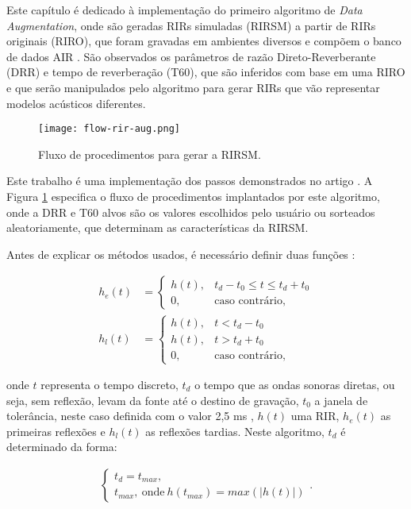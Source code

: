 Este capítulo é dedicado à implementação do primeiro algoritmo de \textit{Data Augmentation}, onde são geradas RIRs simuladas (RIRSM)
a partir de RIRs originais (RIRO), que foram gravadas em ambientes diversos e compõem o banco de dados AIR \cite{AIR_Database}. 
São observados os parâmetros de razão Direto-Reverberante (DRR) e tempo de reverberação (T60), que são
inferidos com base em uma RIRO e que serão manipulados pelo algoritmo para gerar RIRs que vão representar modelos acústicos diferentes.

\begin{figure} [H]
    \centering
    \texttt{[image: flow-rir-aug.png]}
    \caption{Fluxo de procedimentos para gerar a RIRSM.}
    \label{fig:flow-rir-aug}
\end{figure}

Este trabalho é uma implementação dos passos demonstrados no artigo \cite{RIR_Data_Aug}. A Figura \ref{fig:flow-rir-aug} especifica 
o fluxo de procedimentos implantados por este algoritmo, onde a DRR e T60 alvos são os valores escolhidos pelo usuário ou sorteados aleatoriamente,
que determinam as características da RIRSM. 

Antes de explicar os métodos usados, é necessário definir duas funções \cite{RIR_Data_Aug}:

\begin{align} 
    h_e(t) &= 
    \begin{cases} \label{eqn:rir-early}
        h(t), & t_d-t_0 \le t \le t_d+t_0 \\
        0, & \text{caso contrário,}
    \end{cases} \\
    h_l(t) &= 
    \begin{cases} \label{eqn:rir-late}
        h(t), & t < t_d - t_0 \\
        h(t), & t > t_d + t_0 \\
        0, & \text{caso contrário,}
    \end{cases}
\end{align}

\noindent
onde $t$ representa o tempo discreto, $t_d$ o tempo que as ondas sonoras diretas, ou seja, sem reflexão, levam da fonte até o destino de gravação,
$t_0$ a janela de tolerância, neste caso definida com o valor 2,5 ms \cite{RIR_Data_Aug}, 
$h(t)$ uma RIR, $h_e(t)$ as primeiras reflexões e $h_l(t)$ as reflexões tardias.
Neste algoritmo, $t_d$ é determinado da forma:

\begin{align} \label{eqn:t_d}
    \begin{cases}
        t_d = t_{max},\\
        t_{max}, \ \text{onde} \ h(t_{max}) = max(|h(t)|)
    \end{cases}
    .
\end{align}


